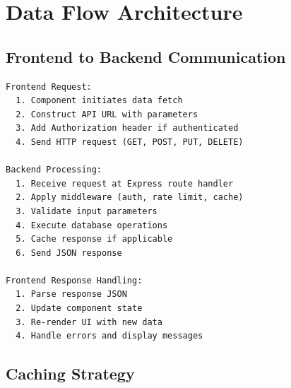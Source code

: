 \documentclass[12pt,a4paper]{report}
\begin{document}
\section{Data Flow Architecture}

\subsection{Frontend to Backend Communication}

\begin{lstlisting}[language=text, caption=API Communication Pattern]
Frontend Request:
  1. Component initiates data fetch
  2. Construct API URL with parameters
  3. Add Authorization header if authenticated
  4. Send HTTP request (GET, POST, PUT, DELETE)

Backend Processing:
  1. Receive request at Express route handler
  2. Apply middleware (auth, rate limit, cache)
  3. Validate input parameters
  4. Execute database operations
  5. Cache response if applicable
  6. Send JSON response

Frontend Response Handling:
  1. Parse response JSON
  2. Update component state
  3. Re-render UI with new data
  4. Handle errors and display messages
\end{lstlisting}

\subsection{Caching Strategy}

\begin{center}
\end{center}
\end{document}
